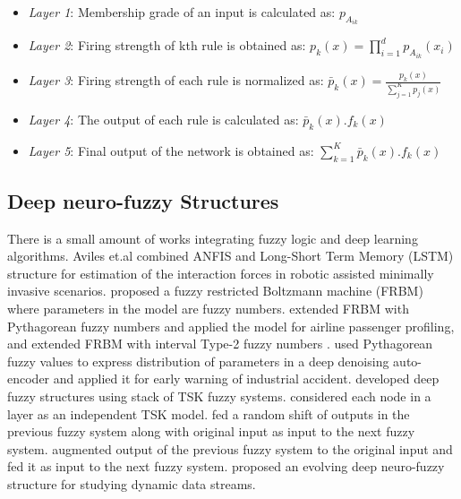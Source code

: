 \documentclass{article}
\begin{document}
\begin{itemize}
  \item \textit{Layer 1}: Membership grade of an input is calculated as: $p_{A_{ik}}$ 	
  \item \textit{Layer 2}: Firing strength of kth rule is obtained as:  $p_k(x) = \prod_{i=1}^d p_{A_{ik}}(x_i)$
  \item \textit{Layer 3}: Firing strength of each rule is normalized as: $\bar{p}_k(x) = \frac{p_k(x)}{\sum_{j=1}^K p_j(x)}$ 	
  \item \textit{Layer 4}: The output of each rule is calculated as: $\bar{p}_k(x).f_k(x)$
  \item \textit{Layer 5}: Final output of the network is obtained as: $\sum_{k=1}^K \bar{p}_k(x).f_k(x)$
\end{itemize}

\subsection{Deep neuro-fuzzy Structures}

There is a small amount of works integrating fuzzy logic and deep learning algorithms. Aviles et.al \citep{aviles2016deep} combined ANFIS and Long-Short Term Memory (LSTM) structure for estimation of the interaction forces in robotic assisted minimally invasive scenarios. \citep{chen2015fuzzy} proposed a fuzzy restricted Boltzmann machine (FRBM) where parameters in the model are fuzzy numbers. \citep{zheng2017airline} extended FRBM with Pythagorean fuzzy numbers \citep{yager2013pythagorean} and applied the model for airline passenger profiling, and \citep{shukla2017interval} extended FRBM with interval Type-2 fuzzy numbers \citep{mendel2002type}. \citep{zheng2017pythagorean} used Pythagorean fuzzy values to express distribution of parameters in a deep denoising auto-encoder and applied it for early warning of industrial accident. \citep{rajurkar2017developing,zhang2018deep,zhou2017stacked,zhou2017deep} developed deep fuzzy structures using stack of TSK fuzzy systems. \citep{rajurkar2017developing} considered each node in a layer as an independent TSK model. \citep{zhou2017stacked} fed a random shift of outputs in the previous fuzzy system along with original input as input to the next fuzzy system. \citep{zhang2018deep,zhou2017deep} augmented output of the previous fuzzy system to the original input and fed it as input to the next fuzzy system. \citep{pratama2018incremental} proposed an evolving deep neuro-fuzzy structure for studying dynamic data streams.
\end{document}
